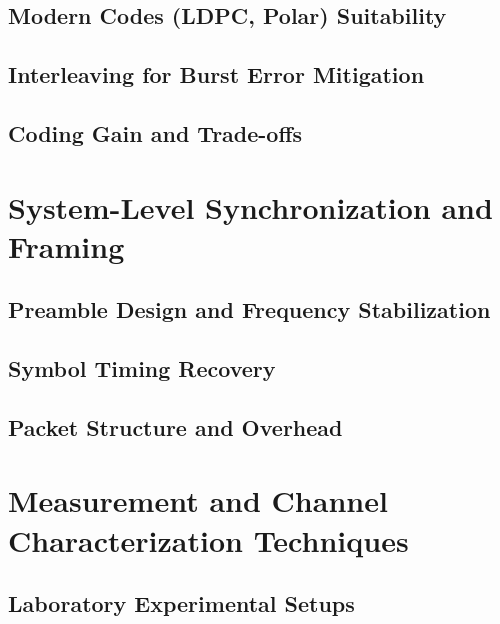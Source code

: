 \subsection{Modern Codes (LDPC, Polar) Suitability}\label{subsec:modern-codes}

\subsection{Interleaving for Burst Error Mitigation}\label{subsec:interleaving}

\subsection{Coding Gain and Trade-offs}\label{subsec:coding-gain}

\section{System-Level Synchronization and Framing}\label{sec:synchronization}
\subsection{Preamble Design and Frequency Stabilization}\label{subsec:preamble}

\subsection{Symbol Timing Recovery}\label{subsec:timing-recovery}

\subsection{Packet Structure and Overhead}\label{subsec:packet-structure}

\section{Measurement and Channel Characterization Techniques}\label{sec:measurement-techniques}
\subsection{Laboratory Experimental Setups}\label{subsec:labb-setup}

